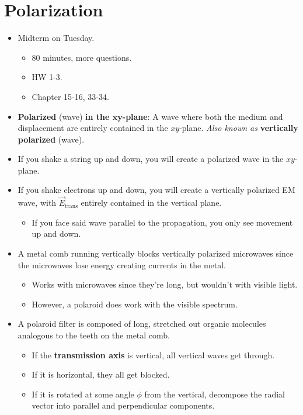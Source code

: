 \documentclass[../notes.tex]{subfiles}
\begin{document}
\section{Polarization}
\begin{itemize}
    \item {}Midterm on Tuesday.
    \begin{itemize}
        \item 80 minutes, more questions.
        \item HW 1-3.
        \item Chapter 15-16, 33-34.
    \end{itemize}
    \item \textbf{Polarized} (wave) \textbf{in the $\bm{xy}$-plane}: A wave where both the medium and displacement are entirely contained in the $xy$-plane. \emph{Also known as} \textbf{vertically polarized} (wave).
    \item If you shake a string up and down, you will create a polarized wave in the $xy$-plane.
    \item If you shake electrons up and down, you will create a vertically polarized EM wave, with $\vec{E}_\text{trans}$ entirely contained in the vertical plane.
    \begin{itemize}
        \item If you face said wave parallel to the propagation, you only see movement up and down.
    \end{itemize}
    \item A metal comb running vertically blocks vertically polarized microwaves since the microwaves lose energy creating currents in the metal.
    \begin{itemize}
        \item Works with microwaves since they're long, but wouldn't with visible light.
        \item However, a polaroid does work with the visible spectrum.
    \end{itemize}
    \item A polaroid filter is composed of long, stretched out organic molecules analogous to the teeth on the metal comb.
    \begin{itemize}
        \item If the \textbf{transmission axis} is vertical, all vertical waves get through.
        \item If it is horizontal, they all get blocked.
        \item If it is rotated at some angle $\phi$ from the vertical, decompose the radial vector into parallel and perpendicular components.

\end{itemize}
\end{itemize}
\end{document}

